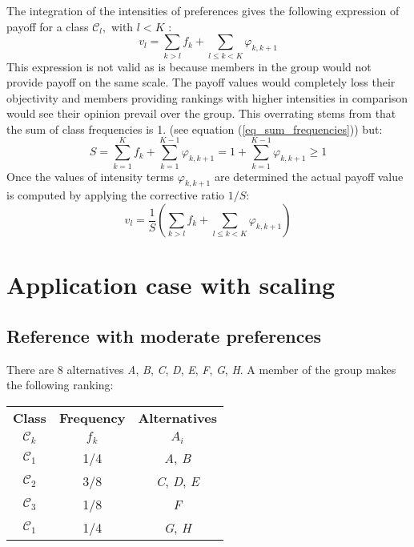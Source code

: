 \documentclass[12pt,a4paper]{article}
\begin{document}
The integration of the intensities of preferences gives the following expression of payoff for a class $\mathcal{C}_l,$ with $l<K$ :
\begin{equation}
v_l = \sum_{k>l}{f_k} + \sum_{l\leq k<K}{\varphi_{k,k+1}}
\end{equation}
This expression is not valid as is because members in the group would not provide payoff on the same scale. The payoff values would completely loss their objectivity and members providing rankings with higher intensities in comparison would see their opinion prevail over the group. This overrating stems from that the sum of class frequencies is 1. (see equation (\ref{eq_sum_frequencies})) but:
\begin{equation}
 S = \sum_{k=1}^K{f_k} + \sum_{k=1}^{K-1}{\varphi_{k,k+1}} = 1 + \sum_{k=1}^{K-1}{\varphi_{k,k+1}} \geq 1
\end{equation}
Once the values of intensity terms $\varphi_{k,k+1}$ are determined the actual payoff value is computed by applying the corrective ratio $1/S$:
\begin{equation}\label{eq_scaled_payoff_with_intensities}
v_l = \frac1S \left( \sum_{k>l}{f_k} + \sum_{l\leq k<K}{\varphi_{k,k+1}} \right)
\end{equation}

\section{Application case with scaling}

\subsection{Reference with moderate preferences}
There are 8 alternatives \textit{A}, \textit{B}, \textit{C}, \textit{D}, \textit{E}, \textit{F}, \textit{G}, \textit{H}. A member of the group makes the following ranking:

\begin{table}[ht]
\centering
\begin{tabular}{|c|c|c|}
\hline
\textbf{Class}&\textbf{Frequency} &\textbf{Alternatives}\\
$\mathcal{C}_k$ & $f_k$ & $A_i$ \\
\hline
$\mathcal{C}_1$ & 1/4  & \textit{A}, \textit{B} \\
$\mathcal{C}_2$ & 3/8  & \textit{C}, \textit{D}, \textit{E} \\
$\mathcal{C}_3$ & 1/8  & \textit{F} \\
$\mathcal{C}_1$ & 1/4  & \textit{G}, \textit{H} \\
\hline
\end{tabular}
\end{table}
\end{document}
